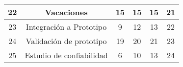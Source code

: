 \begin{table}[H]
\begin{tabular}{|c|c|c|c|c|c|}
22          & Vacaciones                              & 15                          & 15                & 15                          & 21                                        \\ \hline
23          & Integración a Prototipo                 & 9                           & 12                & 13                          & 22                                        \\ \hline
24          & Validación de prototipo                 & 19                          & 20                & 21                          & 23                                        \\ \hline
25          & Estudio de confiabilidad                & 6                           & 10                & 13                          & 24                                        \\ \hline
\end{tabular}
\end{table}








